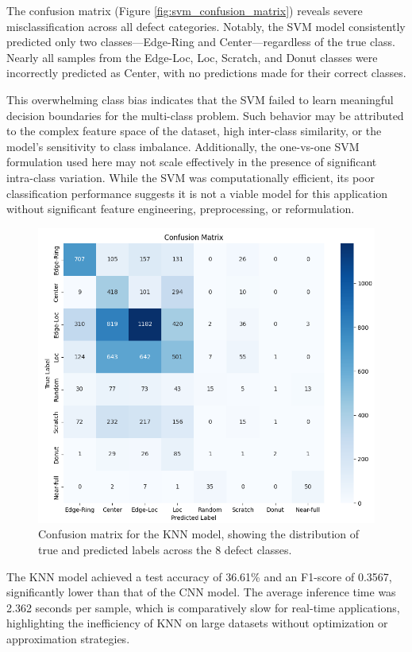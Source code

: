 \documentclass[conference]{IEEEtran}
\begin{document}
The confusion matrix (Figure \ref{fig:svm_confusion_matrix}) reveals severe misclassification across all defect categories. 
Notably, the SVM model consistently predicted only two classes—Edge-Ring and Center—regardless of the true class.
Nearly all samples from the Edge-Loc, Loc, Scratch, and Donut classes were incorrectly predicted as Center, with no predictions made for their correct classes.

This overwhelming class bias indicates that the SVM failed to learn meaningful decision boundaries for the multi-class problem. 
Such behavior may be attributed to the complex feature space of the dataset, high inter-class similarity, or the model's sensitivity to class imbalance. 
Additionally, the one-vs-one SVM formulation used here may not scale effectively in the presence of significant intra-class variation.
While the SVM was computationally efficient, its poor classification performance suggests it is not a viable model for this application without significant feature engineering, preprocessing, or reformulation.

\begin{figure}[h]
    \centering
    \includegraphics[width=0.9\linewidth]{assets/knn_conf_matrix.png}
    \caption{Confusion matrix for the KNN model, showing the distribution of true and predicted labels across the 8 defect classes.}
    \label{fig:knn_confusion_matrix}
\end{figure}

The KNN model achieved a test accuracy of 36.61\% and an F1-score of 0.3567, significantly lower than that of the CNN model. 
The average inference time was 2.362 seconds per sample, which is comparatively slow for real-time applications, highlighting the inefficiency of KNN on large datasets without optimization or approximation strategies.
\end{document}
